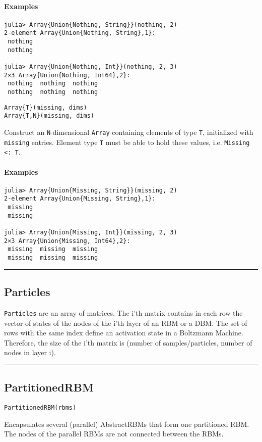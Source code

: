 \paragraph*{Examples}
\begin{verbatim}
julia> Array{Union{Nothing, String}}(nothing, 2)
2-element Array{Union{Nothing, String},1}:
 nothing
 nothing

julia> Array{Union{Nothing, Int}}(nothing, 2, 3)
2×3 Array{Union{Nothing, Int64},2}:
 nothing  nothing  nothing
 nothing  nothing  nothing
\end{verbatim}
\begin{verbatim}
Array{T}(missing, dims)
Array{T,N}(missing, dims)
\end{verbatim}
Construct an \texttt{N}-dimensional \texttt{Array} containing elements of type \texttt{T}, initialized with \texttt{missing} entries. Element type \texttt{T} must be able to hold these values, i.e. \texttt{Missing <: T}.

\paragraph*{Examples}
\begin{verbatim}
julia> Array{Union{Missing, String}}(missing, 2)
2-element Array{Union{Missing, String},1}:
 missing
 missing

julia> Array{Union{Missing, Int}}(missing, 2, 3)
2×3 Array{Union{Missing, Int64},2}:
 missing  missing  missing
 missing  missing  missing
\end{verbatim}
\noindent\rule{\textwidth}{1pt}
\subsection*{Particles}
\texttt{Particles} are an array of matrices. The i'th matrix contains in each row the vector of states of the nodes of the i'th layer of an RBM or a DBM. The set of rows with the same index define an activation state in a Boltzmann Machine. Therefore, the size of the i'th matrix is (number of samples/particles, number of nodes in layer i).

\noindent\rule{\textwidth}{1pt}
\subsection*{PartitionedRBM}
\begin{verbatim}
PartitionedRBM(rbms)
\end{verbatim}
Encapsulates several (parallel) AbstractRBMs that form one partitioned RBM. The nodes of the parallel RBMs are not connected between the RBMs.

